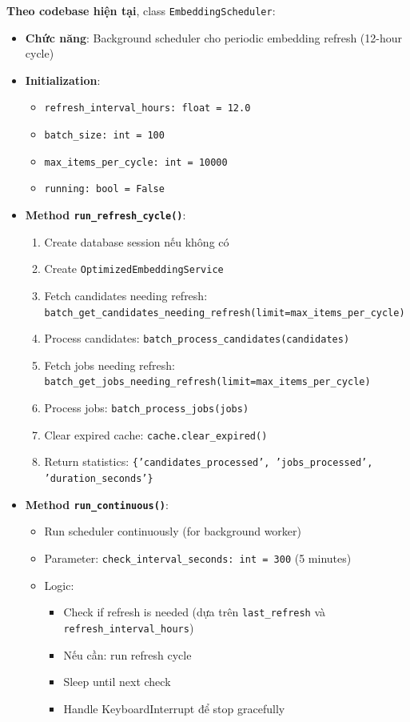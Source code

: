 \textbf{Theo codebase hiện tại}, class \texttt{EmbeddingScheduler}:

\begin{itemize}
    \item \textbf{Chức năng}: Background scheduler cho periodic embedding refresh (12-hour cycle)
    \item \textbf{Initialization}:
    \begin{itemize}
        \item \texttt{refresh\_interval\_hours: float = 12.0}
        \item \texttt{batch\_size: int = 100}
        \item \texttt{max\_items\_per\_cycle: int = 10000}
        \item \texttt{running: bool = False}
    \end{itemize}
    
    \item \textbf{Method \texttt{run\_refresh\_cycle()}}:
    \begin{enumerate}
        \item Create database session nếu không có
        \item Create \texttt{OptimizedEmbeddingService}
        \item Fetch candidates needing refresh: \texttt{batch\_get\_candidates\_needing\_refresh(limit=max\_items\_per\_cycle)}
        \item Process candidates: \texttt{batch\_process\_candidates(candidates)}
        \item Fetch jobs needing refresh: \texttt{batch\_get\_jobs\_needing\_refresh(limit=max\_items\_per\_cycle)}
        \item Process jobs: \texttt{batch\_process\_jobs(jobs)}
        \item Clear expired cache: \texttt{cache.clear\_expired()}
        \item Return statistics: \texttt{\{'candidates\_processed', 'jobs\_processed', 'duration\_seconds'\}}
    \end{enumerate}
    
    \item \textbf{Method \texttt{run\_continuous()}}:
    \begin{itemize}
        \item Run scheduler continuously (for background worker)
        \item Parameter: \texttt{check\_interval\_seconds: int = 300} (5 minutes)
        \item Logic:
        \begin{itemize}
            \item Check if refresh is needed (dựa trên \texttt{last\_refresh} và \texttt{refresh\_interval\_hours})
            \item Nếu cần: run refresh cycle
            \item Sleep until next check
            \item Handle KeyboardInterrupt để stop gracefully
        \end{itemize}
    \end{itemize}
    

\end{itemize}
